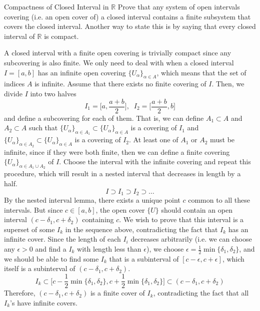   \begin{exercise}{Compactness of Closed Interval in $\mathbb{R}$}
    Prove that any system of open intervals covering (i.e. an open cover of) a closed interval contains a finite subsystem that covers the closed interval. Another way to state this is by saying that every closed interval of $\mathbb{R}$ is compact. 
  \end{exercise}
  \begin{solution}
    A closed interval with a finite open covering is trivially compact since any subcovering is also finite. We only need to deal with when a closed interval $I = [a, b]$ has an infinite open covering $\{U_\alpha \}_{\alpha \in A}$, which means that the set of indices $A$ is infinite. Assume that there exists no finite covering of $I$. Then, we divide $I$ into two halves 
    \begin{equation}
      I_1 = \Big[ a, \frac{a + b}{2}\Big], \;\; I_2 = \Big[ \frac{a + b}{2}, b \Big]
    \end{equation}
    and define a subcovering for each of them. That is, we can define $A_1 \subset A$ and $A_2 \subset A$ such that $\{U_\alpha\}_{\alpha \in A_1} \subset \{U_\alpha \}_{\alpha \in A}$ is a covering of $I_1$ and $\{U_\alpha\}_{\alpha \in A_2} \subset \{U_\alpha \}_{\alpha \in A}$ is a covering of $I_2$. At least one of $A_1$ or $A_2$ must be infinite, since if they were both finite, then we can define a finite covering $\{U_\alpha\}_{\alpha \in A_1 \cup A_2}$ of $I$. Choose the interval with the infinite covering and repeat this procedure, which will result in a nested interval that decreases in length by a half. 
    \begin{equation}
      I \supset I_1 \supset I_2 \supset \ldots
    \end{equation}
    By the nested interval lemma, there exists a unique point $c$ common to all these intervals. But since $c \in [a, b]$, the open cover $\{U\}$ should contain an open interval $(c - \delta_1, c + \delta_2)$ containing $c$. We wish to prove that this interval is a superset of some $I_k$ in the sequence above, contradicting the fact that $I_k$ has an infinite cover. Since the length of each $I_i$ decreases arbitrarily (i.e. we can choose any $\epsilon > 0$ and find a $I_k$ with length less than $\epsilon$), we choose $\epsilon = \frac{1}{2} \min\{\delta_1, \delta_2 \}$, and we should be able to find some $I_k$ that is a subinterval of $[c - \epsilon, c + \epsilon]$, which itself is a subinterval of $(c - \delta_1, c + \delta_2)$. 
    \begin{equation}
      I_k \subset \Big[ c - \frac{1}{2} \min\{\delta_1, \delta_2 \}, c + \frac{1}{2} \min\{\delta_1, \delta_2 \} \Big] \subset (c - \delta_1, c + \delta_2)
    \end{equation}
    Therefore, $(c - \delta_1, c + \delta_2)$ is a finite cover of $I_k$, contradicting the fact that all $I_k$'s have infinite covers. 
  \end{solution}

